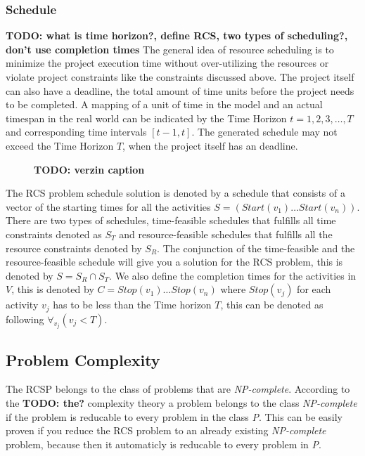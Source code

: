 \documentclass{article}
\newcommand{\TODO}[1]{{\color{red}\textbf{TODO: #1}}}
\newcommand{\start}[1]{\textit{Start}(#1)} %
\begin{document}
\subsubsection{Schedule}
\TODO{what is time horizon?, define RCS, two types of scheduling?, don't use completion times}
The general idea of resource scheduling is to minimize the project execution time without over-utilizing the resources or violate project constraints like the constraints discussed above.
The project itself can also have a deadline, the total amount of time units before the project needs to be completed.
A mapping of a unit of time in the model and an actual timespan in the real world can be indicated by the Time Horizon $t=1,2,3,\ldots,T$ and corresponding time intervals $[t-1,t]$.
The generated schedule may not exceed the Time Horizon $T$, when the project itself has an deadline.

\begin{figure}[h]
	\centering
	
	\caption{\TODO{verzin caption}}
	\label{fig:time_schedule}
\end{figure}

The RCS problem schedule solution is denoted by a schedule that consists of a vector of the starting times for all the activities $S =  (\start{v_1} \ldots \start{v_n})$.
There are two types of schedules, time-feasible schedules that fulfills all time constraints denoted as $S_T$ and resource-feasible schedules that fulfills all the resource constraints denoted by $S_R$.
The conjunction of the time-feasible and the resource-feasible schedule will give you a solution for the RCS problem, this is denoted by $S = S_R \cap S_T$.
We also define the completion times for the activities in $V$, this is denoted by $C = Stop(v_1) \ldots Stop(v_n)$ where $Stop(v_j)$ for each activity $v_j$ has to be less than the Time horizon $T$, this can be denoted as following $\forall_{v_j}(v_j < T)$.

\subsection{Problem Complexity}
The RCSP belongs to the class of problems that are \emph{NP-complete}. 
According to the \TODO{the?} complexity theory a problem belongs to the class \emph{NP-complete} if the problem is reducable to every problem in the class \emph{P}.
This can be easily proven if you reduce the RCS problem to an already existing \emph{NP-complete} problem, because then it automaticly is reducable to every problem in \emph{P}.
\end{document}
